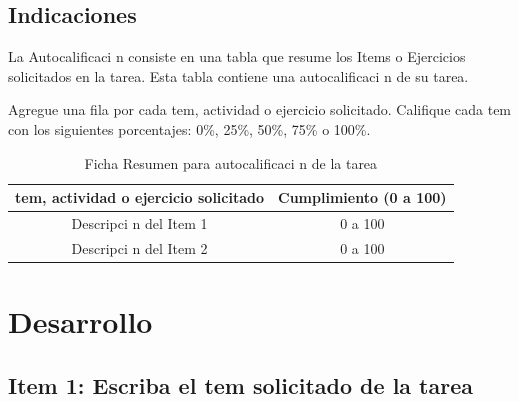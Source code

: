 \documentclass{article}
\begin{document}
\subsection{Indicaciones}
La Autocalificaci n consiste en una tabla que resume los Items o Ejercicios solicitados en la tarea. Esta tabla contiene una autocalificaci n de su tarea. 

Agregue una fila por cada  tem, actividad o ejercicio solicitado. Califique cada  tem con los siguientes porcentajes: 0\%, 25\%, 50\%, 75\% o 100\%.

\begin{table}[h]
    \caption{Ficha Resumen para autocalificaci n de la tarea}

    \centering

    \begin{tabular}{|c|c|}
        \hline

            \textbf{ tem, actividad o ejercicio solicitado} & \textbf{ Cumplimiento (0 a 100)}\\
        \hline
            Descripci n del Item 1 & 0 a 100 \\
        \hline
            Descripci n del Item 2 & 0 a 100 \\
        \hline
    \end{tabular}

    \label{tab:my_label}

\end{table}







\section{Desarrollo}


\subsection{Item 1: Escriba el  tem solicitado de la tarea}
\end{document}
